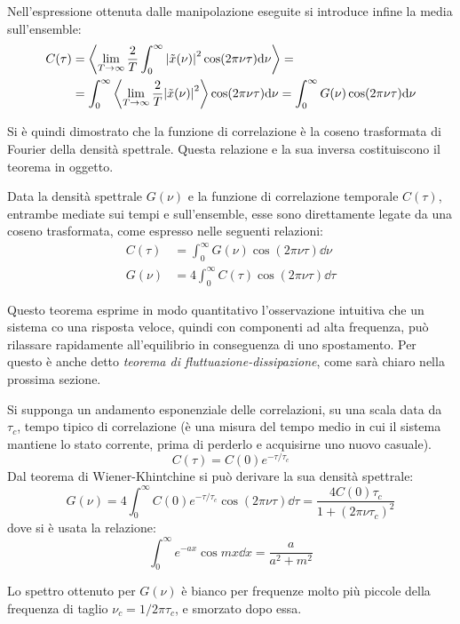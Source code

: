 Nell'espressione ottenuta dalle manipolazione eseguite si introduce infine la media sull'ensemble:
\begin{align*}
C(\tau) &= \expval{\lim\limits_{T \rightarrow \infty} \frac{2}{T} \int_{0}^{\infty} \abs{\tilde{x}(\nu)}^2 \cos( 2\pi \nu \tau) \dd \nu  } =\\
&= \int_{0}^{\infty}  \expval{\lim\limits_{T \rightarrow \infty} \frac{2}{T} \abs{\tilde{x}(\nu)}^2} \cos( 2\pi \nu \tau) \dd \nu = \int_{0}^{\infty}  G(\nu) \cos( 2\pi \nu \tau) \dd \nu
\end{align*}

Si è quindi dimostrato che la funzione di correlazione è la coseno trasformata di Fourier della densità spettrale. Questa relazione e la sua inversa costituiscono il teorema in oggetto.

\begin{thm}
	Data la densità spettrale $ G(\nu) $ e la funzione di correlazione temporale $ C(\tau) $, entrambe mediate sui tempi e sull'ensemble, esse sono direttamente legate da una coseno trasformata, come espresso nelle seguenti relazioni:
	\begin{align*}
		C(\tau) &= \int_{0}^{\infty} G(\nu) \cos( 2\pi \nu \tau) \dd \nu\\
		G(\nu) &= 4 \int_{0}^{\infty} C(\tau) \cos( 2\pi \nu \tau) \dd \tau
	\end{align*}
\end{thm}

Questo teorema esprime in modo quantitativo l'osservazione intuitiva che un sistema co una risposta veloce, quindi con componenti ad alta frequenza, può rilassare rapidamente all'equilibrio in conseguenza di uno spostamento. Per questo è anche detto \textit{teorema di fluttuazione-dissipazione}, come sarà chiaro nella prossima sezione.

\begin{es}
	\label{es:expcorr}
	Si supponga un andamento esponenziale delle correlazioni, su una scala data da $ \tau_c $, tempo tipico di correlazione (è una misura del tempo medio in cui il sistema mantiene lo stato corrente, prima di perderlo e acquisirne uno nuovo casuale).
	\[ C(\tau) = C(0) e^{-\tau/\tau_c} \]
	Dal teorema di Wiener-Khintchine si può derivare la sua densità spettrale:
	\[ G(\nu) = 4 \int_{0}^{\infty} C(0) e^{-\tau/\tau_c} \cos( 2\pi \nu \tau) \dd \tau = \frac{4 C(0) \tau_c}{1 + (2\pi \nu \tau_c)^2} \]
	dove si è usata la relazione:
	\[ \int_0^\infty e^{-ax} \cos mx \dd x = \frac{a}{a^2 + m^2} \]
	
	Lo spettro ottenuto per $ G(\nu) $ è bianco per frequenze molto più piccole della frequenza di taglio $ \nu_c = 1/2\pi\tau_c$, e smorzato dopo essa.
\end{es}


